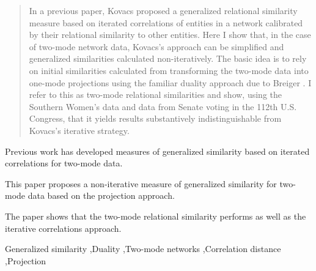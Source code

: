 \documentclass[a4paper,fleqn]{cas-sc}
\begin{document}
\begin{abstract}
In a previous paper, Kovacs \citeyearpar{kovacs2010} proposed a generalized relational similarity measure based on iterated correlations of entities in a network calibrated by their relational similarity to other entities. Here I show that, in the case of two-mode network data, Kovacs's approach can be simplified and generalized similarities calculated non-iteratively. The basic idea is to rely on initial similarities calculated from transforming the two-mode data into one-mode projections using the familiar duality approach due to Breiger \citeyearpar{breiger1974}. I refer to this as two-mode relational similarities and show, using the Southern Women's data and data from Senate voting in the 112th U.S. Congress, that it yields results substantively indistinguishable from Kovacs's iterative strategy. 
\end{abstract}


\begin{highlights}
    \item Previous work has developed measures of generalized similarity based on iterated correlations for two-mode data.
   \item This paper proposes a non-iterative measure of generalized similarity for two-mode data based on the projection approach.
   \item The paper shows that the two-mode relational similarity performs as well as the iterative correlations approach. 
\end{highlights}

\begin{keywords}
Generalized similarity \sep Duality \sep Two-mode networks \sep Correlation distance \sep Projection
\end{keywords}


\maketitle
\newpage
\end{document}
